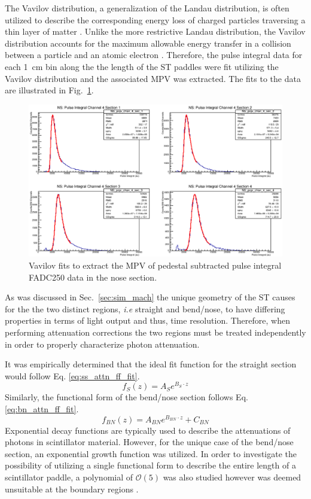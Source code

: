 The Vavilov distribution, a generalization of the Landau distribution, is often utilized to describe the corresponding energy loss of charged particles traversing a thin layer of matter \cite{seltzer_1964}.  Unlike the more restrictive Landau distribution, the Vavilov distribution accounts for the maximum allowable energy transfer in a collision between a particle and an atomic electron \cite{schorr_1973}.  Therefore, the pulse integral data for each 1~cm bin along the the length of the ST paddles were fit utilizing the Vavilov distribution and the associated MPV was extracted.  The fits to the data are illustrated in Fig.~\ref{fig:pisecnosefits}.
	\begin{figure}
		\centering
		\includegraphics[width=1.0\columnwidth]{calibration/figs/pi_sec_nose_fits}
		\caption{Vavilov fits to extract the MPV of pedestal subtracted pulse integral FADC250 data in the nose section.}
		\label{fig:pisecnosefits}
	\end{figure}

As was discussed in Sec.~\ref{sec:sim_mach} the unique geometry of the ST causes for the the two distinct regions, \textit{i.e} straight and bend/nose, to have differing properties in terms of light output and thus, time resolution.  Therefore, when performing attenuation corrections the two regions must be treated independently in order to properly characterize photon attenuation.  

It was empirically determined that the ideal fit function for the straight section would follow Eq. \ref{eq:ss_attn_ff_fit}.
	\begin{equation} \label{eq:ss_attn_ff_fit}
		f_{S}(z) = A_{S}e^{B_{S} \cdot z}
	\end{equation}
Similarly, the functional form of the bend/nose section follows Eq. \ref{eq:bn_attn_ff_fit}.
	\begin{equation} \label{eq:bn_attn_ff_fit}
		f_{BN}(z) = A_{BN}e^{B_{BN} \cdot z} + C_{BN}
	\end{equation}
Exponential decay functions are typically used to describe the attenuations of photons in scintillator material.  However, for the unique case of the bend/nose section, an exponential growth function was utilized.  In order to investigate the possibility of utilizing a single functional form to describe the entire length of a scintillator paddle, a polynomial of $\mathcal{O}(5)$ was also studied however was deemed unsuitable at the boundary regions \cite{pooser16}.

